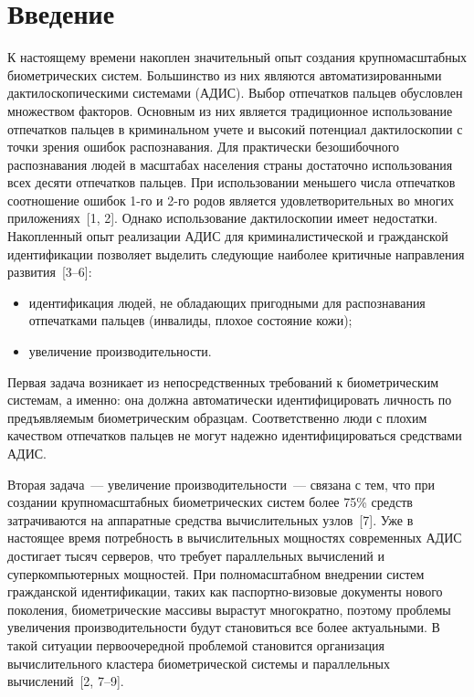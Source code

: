       \begin{multicols}{2}

      \label{st\stat}


     \section{Введение}
     
     К настоящему времени накоплен значительный опыт создания 
крупномасштабных био\-мет\-риче\-ских систем. Большинство из них являются 
авто\-ма\-ти\-зи\-ро\-ван\-ны\-ми дактилоскопическими сис\-те\-ма\-ми (АДИС). Выбор 
отпечатков пальцев обуслов\-лен множеством факторов. Основным из них %
 является традиционное 
использование отпечатков пальцев в криминальном учете и высокий потенциал 
дактилоскопии с точки зрения ошибок распознавания. Для практически 
безошибочного распознавания людей в масштабах населения страны %
достаточно
использования всех десяти отпечатков пальцев.  При 
использовании меньшего чис\-ла отпечатков соотношение ошибок 1-го и 2-го  родов 
является удовлетворительных во многих при\-ло\-же\-ни\-ях~[1, 2]. Однако использование 
дак\-ти\-ло\-ско\-пии имеет недостатки. Накопленный опыт реализации АДИС для 
криминалистической и %
гражданской идентификации позволяет выделить следующие 
наиболее критичные направления развития~[3--6]:
     \begin{itemize}
\item идентификация людей, не обладающих пригодными для распознавания 
отпечатками пальцев (инвалиды, плохое состояние кожи);
\item увеличение производительности.  
\end{itemize}

     Первая задача возникает из непосредственных требований к биометрическим 
системам, а именно: она должна автоматически идентифицировать личность по 
предъявляемым биометрическим образцам. Соответственно люди с плохим качеством 
отпечатков пальцев не могут надежно идентифицироваться средствами АДИС.
     
     Вторая задача~--- увеличение про\-из\-во\-ди\-тель\-ности~--- связана с тем, что при создании 
крупномасштабных биометрических систем более 75\% средств затрачиваются на 
аппаратные средства  вы\-чис\-ли\-тель\-ных узлов~[7].  Уже в настоящее время потребность 
в вы\-чис\-ли\-тель\-ных мощностях со\-времен\-ных АДИС достигает тысяч серверов, что 
требу\-ет параллельных вычислений и супер\-компь\-ю\-тер\-ных мощностей. При 
пол\-но\-масштаб\-ном внед\-ре\-нии систем гражданской идентификации, таких как 
пас\-порт\-но-ви\-зо\-вые до\-кумен\-ты %
нового %
по\-коле\-ния, био\-мет\-ри\-че\-ские массивы
 вырас\-тут 
многократно, поэтому проблемы увеличения производительности \mbox{будут} становиться 
все более актуальными. В такой ситуации первоочередной проблемой становится 
орга\-ни\-за\-ция вы\-чис\-ли\-тель\-но\-го кластера биометрической системы и параллельных 
вычислений~[2, 7--9].
   

\end{multicols}
